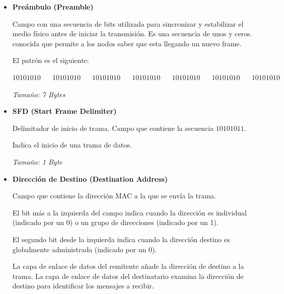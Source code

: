 \documentclass[12pt, fleqn]{report}                             %
\DeclareMathOperator \Space {\quad}                             %
\theoremstyle{break}                                            %
\newcommand{\Color}[2]{\textcolor{#1}{#2}}                      %
\begin{document}
                \begin{itemize}
                    
                    \item 
                        \textbf{Preámbulo (Preamble)} 

                            Campo con una secuencia de bits utilizada para sincronizar y
                            estabilizar el medio físico antes de iniciar la transmisión.
                            Es una secuencia de unos y ceros. conocida que permite a los
                            nodos saber que esta llegando un nuevo frame.

                            El patrón es el siguiente:

                            \Color{Blue900MD}{$10101010 \Space 10101010 \Space 10101010 \Space 10101010 \Space 10101010 \Space 10101010 \Space 10101010$} 

                            \emph{Tamaño: 7 Bytes} 

                    \item
                        \textbf{SFD (Start Frame Delimiter)} 

                            Delimitador de inicio de trama. Campo que contiene la
                            secuencia \Color{Red700MD}{$10101011$}.

                            Indica el inicio de una trama de datos.

                            \emph{Tamaño: 1 Byte} 

                    \item
                        \textbf{Dirección de Destino (Destination Address)}
 
                            Campo que contiene la dirección MAC a la que se envía la trama.

                            El bit más a la izquierda del campo indica cuando la dirección es individual (indicado por un 0)
                            o un grupo de direcciones (indicado por un 1).

                            El segundo bit desde la izquierda indica cuando la dirección destino es globalmente administrada
                            (indicado por un 0). 

                            La capa de enlace de datos del remitente añade la dirección de destino a la trama.
                            La capa de enlace de datos del destinatario examina la dirección de destino para identificar
                            los mensajes a recibir. 


\end{itemize}
\end{document}
